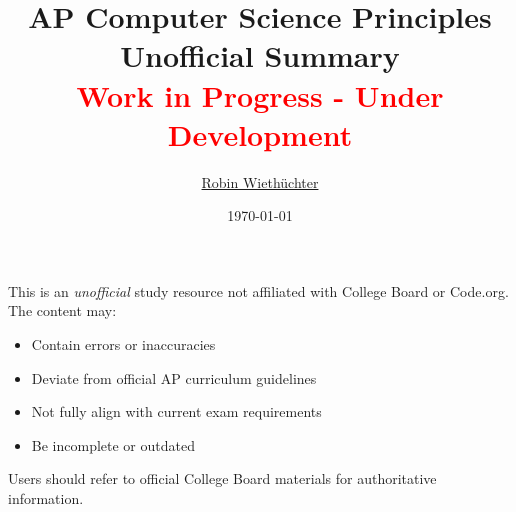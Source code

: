 \documentclass[11pt,oneside]{book}
\title{
    \Huge AP Computer Science Principles\\
    \Large Unofficial Summary\\[0.5em]
    \normalsize\textcolor{red}{Work in Progress - Under Development}
}
\author{\href{https://rowi.dev/}{Robin Wiethüchter}}
\date{\today}
\begin{document}
\maketitle

\begin{tcolorbox}[
    title=Disclaimer,
    colback=white,
    colframe=black,
    width=\textwidth-2cm,
    center
]
This is an \textit{unofficial} study resource not affiliated with College Board\textsuperscript{\textregistered} or Code.org\textsuperscript{\textregistered}. The content may:
\begin{itemize}[leftmargin=*,noitemsep]
    \item Contain errors or inaccuracies
    \item Deviate from official AP\textsuperscript{\textregistered} curriculum guidelines
    \item Not fully align with current exam requirements
    \item Be incomplete or outdated
\end{itemize}
Users should refer to official College Board\textsuperscript{\textregistered} materials for authoritative information.
\end{tcolorbox}

\tableofcontents



% 
% 
% 
% 
% 
% 
% 
% 



\end{document}
